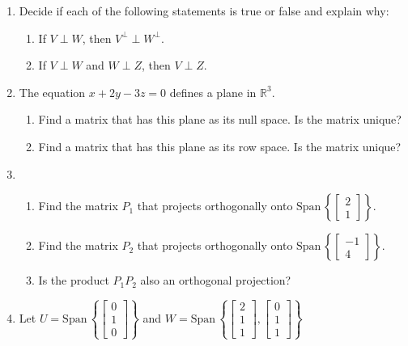 \documentclass[11pt]{article}
\newcommand{\Span}{\textrm{Span}\,}
\begin{document}
\begin{enumerate}
\vspace{0.1in}


\item{Decide if each of the following statements is true or false and explain why:
\begin{enumerate}
	\item {If $V\perp W$, then $V^{\perp}\perp W^{\perp}$.}
	\item {If $V\perp W$ and $W\perp Z$, then $V\perp Z$.} 
\end{enumerate}
}

\item{The equation $x+2y-3z=0$ defines a plane in $\mathbb{R}^3$.
\begin{enumerate}
	\item {Find a matrix that has this plane as its null space.  Is the matrix unique?}
	\item {Find a matrix that has this plane as its row space.  Is the matrix unique?}
\end{enumerate}
}

\vspace{0.1in}

\item{
	\begin{enumerate}
		\item {Find the matrix $P_1$ that projects orthogonally onto $\Span\left\{\left[ \begin{array}{c} 2 \\ 1   \end{array}\right]\right\}$.}
		\item{Find the matrix $P_2$ that projects orthogonally onto $\Span\left\{\left[ \begin{array}{c} -1 \\ 4   \end{array}\right]\right\}$.}
		\item{Is the product $P_1P_2$ also an orthogonal projection?}
	\end{enumerate}

}

\vspace{0.2in}

\item{Let $U = \Span\left\{\left[ \begin{array}{c} 0 \\ 1 \\ 0   \end{array}\right]\right\}$ and
	$W = \Span\left\{
	\left[ \begin{array}{c} 2 \\ 1 \\ 1  \end{array}\right],
	\left[ \begin{array}{c} 0 \\ 1 \\ 1  \end{array}\right]
	\right\}$
	
}
\end{enumerate}
\end{document}
